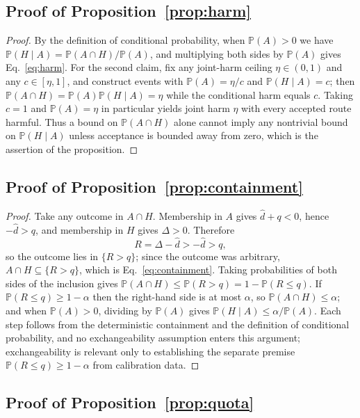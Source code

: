 \documentclass[aps,prx,reprint,superscriptaddress,floatfix]{revtex4-2}
\newcommand{\Pp}{\mathbb{P}}
\begin{document}
\subsection{Proof of Proposition~\ref{prop:harm}}
\label{app:proof-harm}

\begin{proof}
By the definition of conditional probability, when $\Pp(A)>0$ we have
$\Pp(H\mid A)=\Pp(A\cap H)/\Pp(A)$, and multiplying both sides by $\Pp(A)$ gives
Eq.~\eqref{eq:harm}.  For the second claim, fix any joint-harm ceiling
$\eta\in(0,1)$ and any $c\in[\eta,1]$, and construct events with $\Pp(A)=\eta/c$
and $\Pp(H\mid A)=c$; then $\Pp(A\cap H)=\Pp(A)\Pp(H\mid A)=\eta$ while the
conditional harm equals $c$.  Taking $c=1$ and $\Pp(A)=\eta$ in particular yields
joint harm $\eta$ with every accepted route harmful.  Thus a bound on
$\Pp(A\cap H)$ alone cannot imply any nontrivial bound on $\Pp(H\mid A)$ unless
acceptance is bounded away from zero, which is the assertion of the proposition.
\end{proof}

\subsection{Proof of Proposition~\ref{prop:containment}}
\label{app:proof-containment}

\begin{proof}
Take any outcome in $A\cap H$.  Membership in $A$ gives $\widehat d+q<0$, hence
$-\widehat d>q$, and membership in $H$ gives $\Delta>0$.  Therefore
\[
 R=\Delta-\widehat d>-\widehat d>q ,
\]
so the outcome lies in $\{R>q\}$; since the outcome was arbitrary,
$A\cap H\subseteq\{R>q\}$, which is Eq.~\eqref{eq:containment}.  Taking
probabilities of both sides of the inclusion gives
$\Pp(A\cap H)\le\Pp(R>q)=1-\Pp(R\le q)$.  If $\Pp(R\le q)\ge1-\alpha$ then the
right-hand side is at most $\alpha$, so $\Pp(A\cap H)\le\alpha$; and when
$\Pp(A)>0$, dividing by $\Pp(A)$ gives $\Pp(H\mid A)\le\alpha/\Pp(A)$.  Each step
follows from the deterministic containment and the definition of conditional
probability, and no exchangeability assumption enters this argument;
exchangeability is relevant only to establishing the separate premise
$\Pp(R\le q)\ge1-\alpha$ from calibration data.
\end{proof}

\subsection{Proof of Proposition~\ref{prop:quota}}
\label{app:proof-quota}
\end{document}

